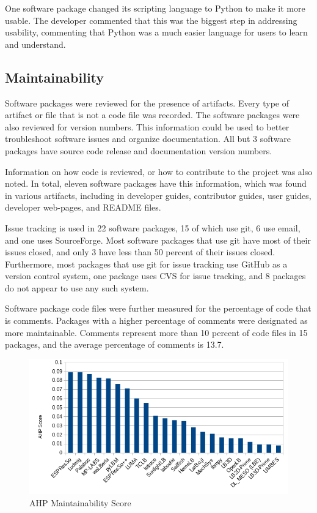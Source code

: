 \documentclass[12pt, notitlepage]{article}
\begin{document}
One software package changed its scripting language to Python to make it more usable. The developer commented that this was the biggest step in addressing usability, commenting that Python was a much easier language for users to learn and understand. 

\subsection{Maintainability}

Software packages were reviewed for the presence of artifacts. Every type of artifact or file that is not a code file was recorded. The software packages were also reviewed for version numbers. This information could be used to better troubleshoot software issues and organize documentation. All but 3 software packages have source code release and documentation version numbers. 

Information on how code is reviewed, or how to contribute to the project was also noted. In total, eleven software packages have this information, which was found in various artifacts, including in developer guides, contributor guides, user guides, developer web-pages, and README files. 

Issue tracking is used in 22 software packages, 15 of which use git, 6 use email, and one uses SourceForge. Most software packages that use git have most of their issues closed, and only 3 have less than 50 percent of their issues closed. Furthermore, most packages that use git for issue tracking use GitHub as a version control system, one package uses CVS for issue tracking, and 8 packages do not appear to use any such system.

Software package code files were further measured for the percentage of code that is comments. Packages with a higher percentage of comments were designated as more maintainable. Comments represent more than 10 percent of code files in 15 packages, and the average percentage of comments is 13.7.


\begin{figure}[h!]
	\begin{center}
		\includegraphics[width=1.0\textwidth]{maintainability_chart}
		\caption{AHP Maintainability Score}
		\label{Fig_Maintainability}
	\end{center}
\end{figure}
\end{document}
